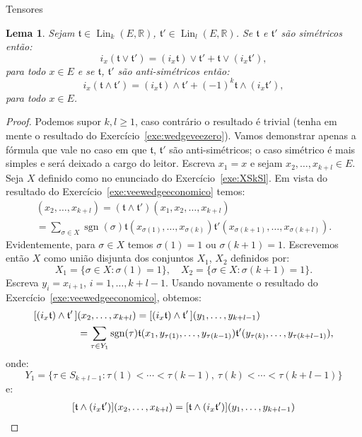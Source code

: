 \documentclass[oneside,11pt]{amsart}
\newcommand{\R}{\mathds R}
\DeclareMathOperator{\Lin}{Lin}
\DeclareMathOperator{\sgn}{sgn}
\theoremstyle{remark}\newtheorem{exercise}{Exercício}[section]
\theoremstyle{plain}\newtheorem{teo}{Teorema}[section]
\theoremstyle{plain}\newtheorem{lem}[teo]{Lema}
\theoremstyle{plain}\newtheorem{prop}[teo]{Proposição}
\theoremstyle{definition}\newtheorem{defin}[teo]{Definição}
\theoremstyle{remark}\newtheorem{rem}[teo]{Observação}
\theoremstyle{definition}\newtheorem{example}[teo]{Exemplo}
\numberwithin{equation}{section}
\begin{document}
\begin{section}{Tensores}
\begin{lem}\label{thm:lemiveewedge}
Sejam $\mathfrak t\in\Lin_k(E,\R)$, $\mathfrak t'\in\Lin_l(E,\R)$. Se $\mathfrak t$ e $\mathfrak t'$ são simétricos então:
\[i_x(\mathfrak t\vee\mathfrak t')=(i_x\mathfrak t)\vee\mathfrak t'+\mathfrak t\vee(i_x\mathfrak t'),\]
para todo $x\in E$ e se $\mathfrak t$, $\mathfrak t'$ são anti-simétricos então:
\[i_x(\mathfrak t\wedge\mathfrak t')=(i_x\mathfrak t)\wedge\mathfrak t'+(-1)^k\mathfrak t\wedge(i_x\mathfrak t'),\]
para todo $x\in E$.
\end{lem}
\begin{proof}
Podemos supor $k,l\ge1$, caso contrário o resultado é trivial (tenha em mente o resultado do Exercício~\ref{exe:wedgeveezero}).
Vamos demonstrar apenas a fórmula que vale no caso em que $\mathfrak t$, $\mathfrak t'$ são anti-simétricos; o caso simétrico é mais simples
e será deixado a cargo do leitor. Escreva $x_1=x$ e sejam
$x_2,\ldots,x_{k+l}\in E$. Seja $X$ definido como no enunciado do Exercício~\ref{exe:XSkSl}. Em vista do resultado do Exercício~\ref{exe:veewedgeeconomico} temos:
\begin{multline*}
[i_x(\mathfrak t\wedge\mathfrak t')](x_2,\ldots,x_{k+l})=(\mathfrak t\wedge\mathfrak t')(x_1,x_2,\ldots,x_{k+l})\\
=\sum_{\sigma\in X}\sgn(\sigma)\mathfrak t(x_{\sigma(1)},\ldots,x_{\sigma(k)})
\mathfrak t'(x_{\sigma(k+1)},\ldots,x_{\sigma(k+l)}).
\end{multline*}
Evidentemente, para $\sigma\in X$ temos $\sigma(1)=1$ ou $\sigma(k+1)=1$. Escrevemos então $X$ como união disjunta dos conjuntos $X_1$, $X_2$ definidos por:
\[X_1=\big\{\sigma\in X:\sigma(1)=1\big\},\quad X_2=\big\{\sigma\in X:\sigma(k+1)=1\big\}.\]
Escreva $y_i=x_{i+1}$, $i=1,\ldots,k+l-1$. Usando novamente o resultado do Exercício~\ref{exe:veewedgeeconomico}, obtemos:
\begin{align}
\notag[(i_x\mathfrak t)\wedge\mathfrak t'\,]&(x_2,\ldots,x_{k+l})=[(i_x\mathfrak t)\wedge\mathfrak t'\,](y_1,\ldots,y_{k+l-1})\\
&=\sum_{\tau\in Y_1}\sgn(\tau)\mathfrak t(x_1,y_{\tau(1)},\ldots,y_{\tau(k-1)})
\mathfrak t'(y_{\tau(k)},\ldots,y_{\tau(k+l-1)}),\label{eq:Y1}
\end{align}
onde:
\[Y_1=\big\{\tau\in S_{k+l-1}:\tau(1)<\cdots<\tau(k-1),\ \tau(k)<\cdots<\tau(k+l-1)\big\}\]
e:
\begin{align}
\notag[\mathfrak t\wedge(i_x\mathfrak t')]&(x_2,\ldots,x_{k+l})=[\mathfrak t\wedge(i_x\mathfrak t')](y_1,\ldots,y_{k+l-1})\\

\end{align}
\end{proof}
\end{section}
\end{document}
